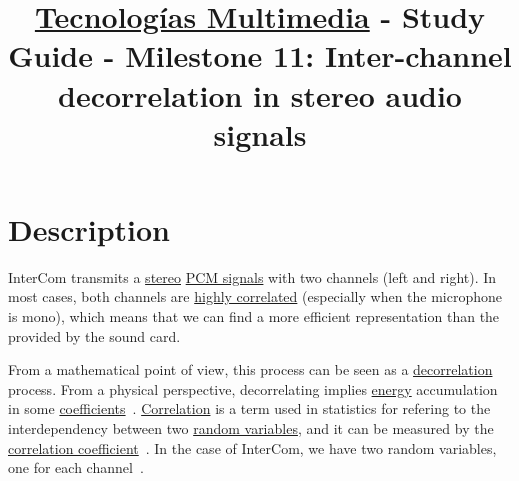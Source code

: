\title{\href{https://www.ual.es/estudios/grados/presentacion/plandeestudios/asignatura/4015/40154321?idioma=zh_CN}{Tecnologías Multimedia} - Study Guide - Milestone 11: Inter-channel decorrelation in stereo audio signals}

\maketitle

\section{Description}

InterCom transmits a
\href{https://en.wikipedia.org/wiki/Stereophonic_sound}{stereo}
\href{https://en.wikipedia.org/wiki/Pulse-code_modulation}{PCM
  signals} with two channels (left and right). In most cases, both
channels are
\href{https://en.wikipedia.org/wiki/Binaural_recording}{highly
  correlated} (especially when the microphone is mono), which means
that we can find a more efficient representation than the provided by
the sound card.

From a mathematical point of view, this process can be seen as a
\href{https://en.wikipedia.org/wiki/Decorrelation}{decorrelation}
process. From a physical perspective, decorrelating implies \href{https://en.wikipedia.org/wiki/Energy_(signal_processing)}{energy}
accumulation in some
\href{https://web.stanford.edu/class/ee398a/handouts/lectures/07-TransformCoding.pdf}{coefficients}~\cite{sayood2017introduction}. \href{https://en.wikipedia.org/wiki/Correlation_and_dependence}{Correlation}
is a term used in statistics for refering to the interdependency
between
two \href{https://en.wikipedia.org/wiki/Random_variable}{random
variables}, and it can be measured by the
\href{https://www.mathsisfun.com/data/correlation.html}{correlation
  coefficient}~\cite{thinkstats}. In the case of InterCom, we have two
  random variables, one for each channel~\cite{bosi2003intro}.

